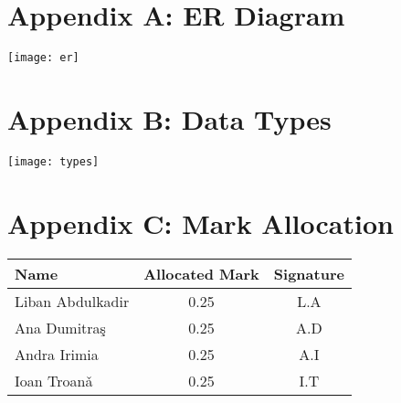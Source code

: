 \documentclass{article}
\newcommand{\perlscript}[2]{
\begin{itemize}
\item[]
\end{itemize}
}
\newcounter{homeworkProblemCounter} %
\newcommand{\homeworkProblemName}{}
\newenvironment{homeworkProblem}[1][Question \arabic{homeworkProblemCounter}]{ %
\stepcounter{homeworkProblemCounter} %
\renewcommand{\homeworkProblemName}{#1} %
\section{\homeworkProblemName} %
}{
}
\newcommand{\problemAnswer}[1]{ %
\noindent\framebox[\columnwidth][c]{\begin{minipage}{0.98\columnwidth}#1\end{minipage}} %
}
\begin{document}
\chapter{\textbf{Appendix A: ER Diagram}}
\begin{center}
\texttt{[image: er]} %
\end{center}

\chapter{\textbf{Appendix B: Data Types}}
\begin{center}
\texttt{[image: types]} %
\end{center}

\chapter{\textbf{Appendix C: Mark Allocation}}
\begin{center}
    \begin{tabular}{| l | c | c |}
    \hline
    \textbf{Name} & \textbf{Allocated Mark} & \textbf{Signature} \\ \hline
    Liban Abdulkadir & 0.25 & L.A \\ \hline
    Ana Dumitra\c{s} & 0.25 & A.D \\ \hline
    Andra Irimia & 0.25 & A.I \\ \hline
    Ioan Troan\v{a} & 0.25 & I.T \\ \hline
    \end{tabular}
\end{center}









\end{document}
